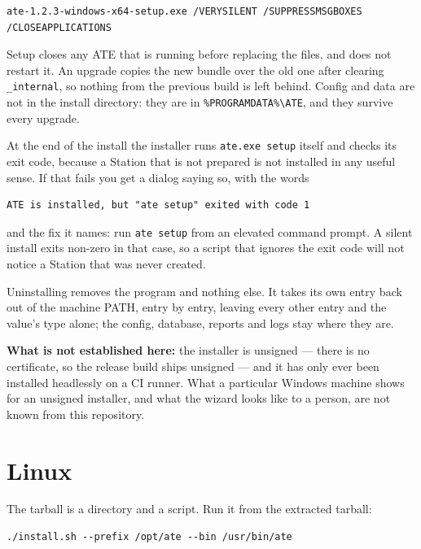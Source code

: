 \begin{lstlisting}[language=ATEShell]
ate-1.2.3-windows-x64-setup.exe /VERYSILENT /SUPPRESSMSGBOXES /CLOSEAPPLICATIONS
\end{lstlisting}

Setup closes any ATE that is running before replacing the files, and does not restart it. An
upgrade copies the new bundle over the old one after clearing \texttt{\_internal}, so nothing from
the previous build is left behind. Config and data are not in the install directory: they are in
\texttt{\%PROGRAMDATA\%\textbackslash ATE}, and they survive every upgrade.

At the end of the install the installer runs \texttt{ate.exe setup} itself and checks its exit
code, because a Station that is not prepared is not installed in any useful sense. If that fails
you get a dialog saying so, with the words

\begin{lstlisting}[language=ATEShell]
ATE is installed, but "ate setup" exited with code 1
\end{lstlisting}

and the fix it names: run \texttt{ate setup} from an elevated command prompt. A silent install
exits non-zero in that case, so a script that ignores the exit code will not notice a Station that
was never created.

Uninstalling removes the program and nothing else. It takes its own entry back out of the machine
PATH, entry by entry, leaving every other entry and the value's type alone; the config, database,
reports and logs stay where they are.

\textbf{What is not established here:} the installer is unsigned --- there is no certificate, so
the release build ships unsigned --- and it has only ever been installed headlessly on a CI
runner. What a particular Windows machine shows for an unsigned installer, and what the wizard
looks like to a person, are not known from this repository.

\section{Linux}

The tarball is a directory and a script. Run it from the extracted tarball:

\begin{lstlisting}[language=ATEShell]
./install.sh --prefix /opt/ate --bin /usr/bin/ate
\end{lstlisting}

